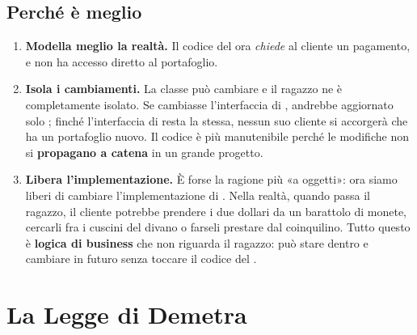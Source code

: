 \subsection{Perché è meglio}

\begin{enumerate}
  \item \textbf{Modella meglio la realtà.} Il codice del  ora \textit{chiede} al cliente un pagamento, e non
        ha accesso diretto al portafoglio.
  \item \textbf{Isola i cambiamenti.} La classe  può cambiare e il ragazzo ne è completamente isolato. Se
        cambiasse l'interfaccia di , andrebbe aggiornato solo ; finché l'interfaccia di
         resta la stessa, nessun suo cliente si accorgerà che ha un portafoglio nuovo. Il codice è più
        manutenibile perché le modifiche non si \textbf{propagano a catena} in un grande progetto.
  \item \textbf{Libera l'implementazione.} È forse la ragione più «a oggetti»: ora siamo liberi di cambiare
        l'implementazione di . Nella realtà, quando passa il ragazzo, il cliente potrebbe prendere i due
        dollari da un barattolo di monete, cercarli fra i cuscini del divano o farseli prestare dal coinquilino. Tutto questo
        è \textbf{logica di business} che non riguarda il ragazzo: può stare dentro  e cambiare in futuro
        senza toccare il codice del .
\end{enumerate}


\section{La Legge di Demetra}

